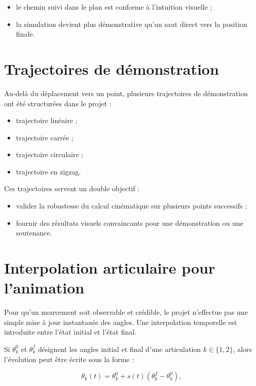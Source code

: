\documentclass[12pt,a4paper]{report}
\begin{document}
\begin{itemize}
    \item le chemin suivi dans le plan est conforme à l'intuition visuelle ;
    \item la simulation devient plus démonstrative qu'un saut direct vers la position finale.
\end{itemize}

\section{Trajectoires de démonstration}

Au-delà du déplacement vers un point, plusieurs trajectoires de démonstration ont été
structurées dans le projet :

\begin{itemize}
    \item trajectoire linéaire ;
    \item trajectoire carrée ;
    \item trajectoire circulaire ;
    \item trajectoire en zigzag.
\end{itemize}

Ces trajectoires servent un double objectif :

\begin{itemize}
    \item valider la robustesse du calcul cinématique sur plusieurs points successifs ;
    \item fournir des résultats visuels convaincants pour une démonstration ou une soutenance.
\end{itemize}

\section{Interpolation articulaire pour l'animation}

Pour qu'un mouvement soit observable et crédible, le projet n'effectue pas une simple
mise à jour instantanée des angles. Une interpolation temporelle est introduite entre
l'état initial et l'état final.

Si $\theta_k^0$ et $\theta_k^f$ désignent les angles initial et final d'une articulation
$k \in \{1,2\}$, alors l'évolution peut être écrite sous la forme :

\begin{equation}
    \theta_k(t) = \theta_k^0 + s(t)\left(\theta_k^f - \theta_k^0\right),
\end{equation}
\end{document}
